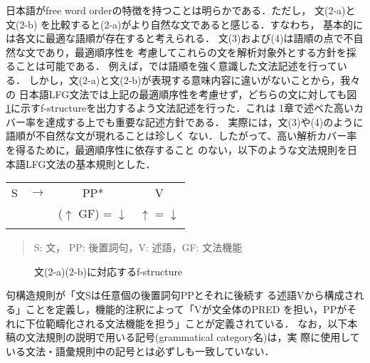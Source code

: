 日本語がfree word orderの特徴を持つことは明らかである．ただし，
文(2-a)と文(2-b) を比較すると(2-a)がより自然な文であると感じる．すなわち，
基本的には各文に最適な語順が存在すると考えられる\cite{shibatani1978}．
文(3)および(4)は語順の点で不自然な文であり，最適順序性を
考慮してこれらの文を解析対象外とする方針を採ることは可能である．
例えば，\cite{otani2000}では語順を強く意識した文法記述を行っている．
しかし，文(2-a)と文(2-b)が表現する意味内容に違いがないことから，我々の
日本語LFG文法では上記の最適順序性を考慮せず，どちらの文に対しても図
\ref{fig4-1}に示すf-structureを出力するよう文法記述を行った．これは
1章で述べた高いカバー率を達成する上でも重要な記述方針である．
実際には，文(3)や(4)のように語順が不自然な文が現れることは珍しく
ない．したがって、高い解析カバー率を得るために，最適順序性に依存すること
のない，以下のような文法規則を日本語LFG文法の基本規則とした．


\begin{table}[htbp]
\begin{center}
\begin{tabular}{llcc}
\vspace{-1mm}
S \quad& $\longrightarrow$\qquad\qquad \hspace{-9mm} & PP* & \hspace*{-4.5mm} V\\
\vspace{-1mm}
&&($\uparrow$ GF) = $\downarrow$ & \hspace*{-4.5mm} $\uparrow$ = $\downarrow$\\
\vspace{-7mm}
\end{tabular}
\end{center}
\end{table}
\begin{quote}
S: 文， PP: 後置詞句，V: 述語，GF: 文法機能
\end{quote}
\vspace{3mm}

\begin{figure}[htbp]
\center
\epsfxsize=110.7mm
\caption{文(2-a)(2-b)に対応するf-structure}
\label{fig4-1}
\end{figure}

句構造規則が「文Sは任意個の後置詞句PPとそれに後続す
る述語Vから構成される」ことを定義し，機能的注釈によって「Vが文全体のPRED
を担い，PPがそれに下位範疇化される文法機能を担う」ことが定義されている．
なお，以下本稿の文法規則の説明で用いる記号(grammatical category名)は，実
際に使用している文法・語彙規則中の記号とは必ずしも一致していない．

